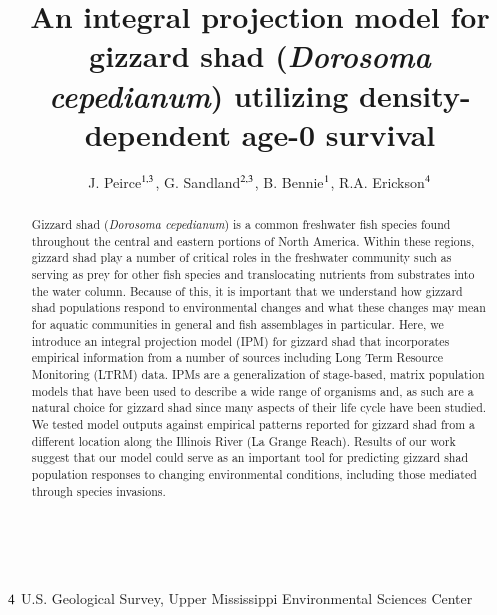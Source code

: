 \documentclass[preprint,review,12pt,authoryear]{elsarticle}
\begin{document}
\linenumbers
\begin{frontmatter}

 \\

\title{An integral projection model for gizzard shad (\emph{Dorosoma cepedianum}) utilizing density-dependent age-0 survival}

\author{ J. Peirce$^{\rm 1,3}$,  G.  Sandland$^{\rm 2,3}$, B. Bennie$^{\rm 1}$, R.A. Erickson$^{\rm 4}$}
\address{
${\rm 1}$ University of Wisconsin - La Crosse, Mathematics \& Statistics Department\\ 
${\rm 2}$ University of Wisconsin - La Crosse, Biology Department\\
${\rm 3}$ River Studies Center} 
${\rm 4}$ U.S. Geological Survey, Upper Mississippi Environmental Sciences Center\\ 

\begin{abstract}
Gizzard shad (\emph{Dorosoma cepedianum}) is a common freshwater fish species found throughout the central and eastern portions of North America. 
Within these regions, gizzard shad play a number of critical roles in the freshwater community such as serving as prey for other fish species and translocating nutrients from substrates into the water column. 
Because of this, it is important that we understand how gizzard shad populations respond to environmental changes and what these changes may mean for aquatic communities in general and fish assemblages in particular. 
Here, we introduce an integral projection model (IPM) for gizzard shad that incorporates empirical information from a number of sources including Long Term Resource Monitoring (LTRM) data. 
IPMs are a generalization of stage-based, matrix population models that have been used to describe a wide range of organisms and, as such are a natural choice for gizzard shad since many aspects of their life cycle have been studied. 
We tested model outputs against empirical patterns reported for gizzard shad from a different location along the Illinois River (La Grange Reach). 
Results of our work suggest that our model could serve as an important tool for predicting gizzard shad population responses to changing environmental conditions, including those mediated through species invasions.
\end{abstract}


\end{frontmatter}
\end{document}
